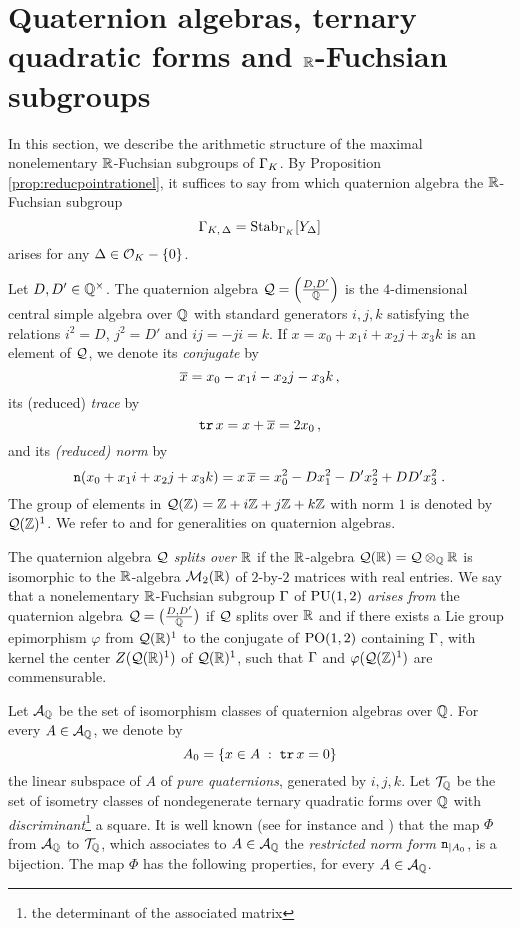 \documentclass[11pt]{article}
\begin{document}
\section{Quaternion algebras, ternary quadratic forms and 
${\mathbb R}$-Fuchsian subgroups}
\label{sect:ternquad}

In this section, we describe the arithmetic structure of the maximal
nonelementary ${\mathbb R}$-Fuchsian subgroups of $\Gamma_K$.  By Proposition
\ref{prop:reducpointrationel}, it suffices to say from which
quaternion algebra the ${\mathbb R}$-Fuchsian subgroup
$$
\Gamma_{K,\,\Delta}=\operatorname{Stab}_{\Gamma_K}[Y_\Delta]
$$ 
arises for any $\Delta\in{\cal O}_K-\{0\}$.

Let $D,D'\in{\mathbb Q}^\times$. The quaternion algebra ${\cal Q}=
\Big(\frac{D,D'}{{\mathbb Q}}\Big)$ is the $4$-dimensional central simple
algebra over ${\mathbb Q}$ with standard generators $i,j,k$ satisfying the
relations $i^2=D$, $j^2=D'$ and $ij=-ji=k$. If $x= x_0+x_1i+x_2j+x_3k$
is an element of ${\cal Q}$, we denote its {\it conjugate} by
$$
{\overline{x}}=x_0-x_1i-x_2j-x_3k\,,
$$ 
its (reduced) {\em trace} by
$$
\operatorname{\tt tr} x=x+{\overline{x}} = 2x_0\,,
$$ 
and its {\em (reduced) norm} by
$$
\operatorname{\tt n}(x_0+x_1i+x_2j+x_3k)=x\,{\overline{x}}=x_0^2-Dx_1^2-D'x_2^2+DD'x_3^2\;.
$$ 
The group of elements in ${\cal Q}({\mathbb Z})={\mathbb Z}+i{\mathbb Z}+j{\mathbb Z}+k{\mathbb Z}$ with norm $1$
is denoted by ${\cal Q}({\mathbb Z})^1$. We refer to \cite{Vigneras80} and
\cite{MacRei03} for generalities on quaternion algebras.

The quaternion algebra ${\cal Q}$ {\em splits over ${\mathbb R}$} if the
${\mathbb R}$-algebra ${\cal Q}({\mathbb R})={\cal Q}\otimes_{\mathbb Q}{\mathbb R}$ is isomorphic to the
${\mathbb R}$-algebra ${\cal M}_2({\mathbb R})$ of $2$-by-$2$ matrices with real entries.
We say that a nonelementary ${\mathbb R}$-Fuchsian subgroup $\Gamma$ of
$\operatorname{PU}(1,2)$ {\it arises from} the quaternion algebra ${\cal Q}=
\big(\frac{D,D'}{{\mathbb Q}}\big)$ if ${\cal Q}$ splits over ${\mathbb R}$ and if there
exists a Lie group epimorphism $\varphi$ from ${\cal Q}({\mathbb R})^1$ to the
conjugate of $\operatorname{PO}(1,2)$ containing $\Gamma$, with kernel the center
$Z({\cal Q}({\mathbb R})^1)$ of ${\cal Q}({\mathbb R})^1$, such that $\Gamma$ and
$\varphi({\cal Q}({\mathbb Z})^1)$ are commensurable.


Let ${\cal A}_{\mathbb Q}$ be the set of isomorphism classes of quaternion
algebras over ${\mathbb Q}$. For every $A\in {\cal A}_{\mathbb Q}$, we denote by
$$
A_0=\{x\in A\;:\; \operatorname{\tt tr} x=0\}
$$
the linear subspace of $A$ of {\it pure quaternions}, generated by
$i,j,k$.  Let ${\cal T}_{\mathbb Q}$ be the set of isometry classes of nondegenerate
ternary quadratic forms over ${\mathbb Q}$ with {\it
  discriminant}\footnote{the determinant of the associated matrix} a
square. It is well known (see for instance \cite[\S
  2.3--2.4]{MacRei03} and \cite[\S I.3]{Vigneras80}) that the map
$\Phi$ from ${\cal A}_{\mathbb Q}$ to ${\cal T}_{\mathbb Q}$, which associates to $A\in {\cal A}_{\mathbb Q}$
the {\it restricted norm form} $\operatorname{\tt n}_{\mid A_0}$, is a bijection.  The
map $\Phi$ has the following properties, for every $A\in {\cal A}_{\mathbb Q}$.
\end{document}
